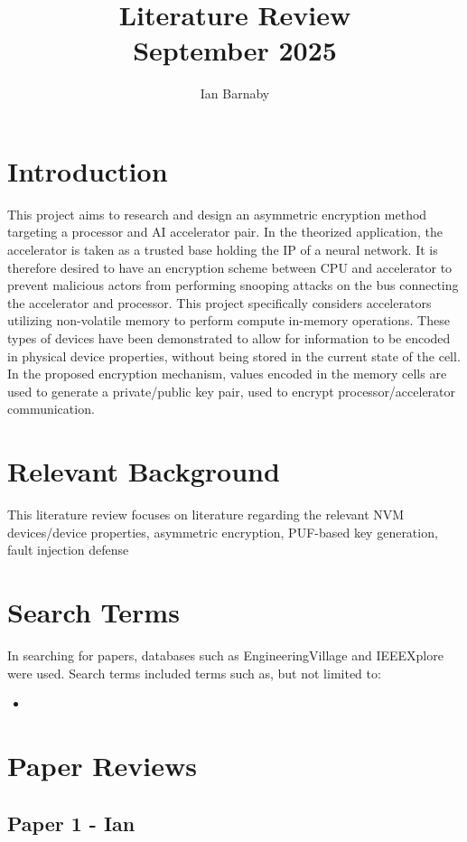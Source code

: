 \documentclass[sigconf,authoryear]{acmart}
\title{Literature Review\protect\\ \large September 2025}
\author{Ian Barnaby}\author{}\author{}
\begin{document}
\maketitle

\section{Introduction}
This project aims to research and design an asymmetric encryption method targeting a processor and AI accelerator pair. In the 
theorized application, the accelerator is taken as a trusted base holding the IP of a neural network. It is therefore desired to
have an encryption scheme between CPU and accelerator to prevent malicious actors from performing snooping attacks on the bus connecting
the accelerator and processor. This project specifically considers accelerators utilizing non-volatile memory to perform compute 
in-memory operations. These types of devices have been demonstrated to allow for information to be encoded in physical device 
properties, without being stored in the current state of the cell. In the proposed encryption mechanism, values encoded 
in the memory cells are used to generate a private/public key pair, used to encrypt processor/accelerator communication.

\section{Relevant Background}
This literature review focuses on literature regarding the relevant NVM devices/device properties, asymmetric encryption, PUF-based key
generation, fault injection defense


\section{Search Terms}
In searching for papers, databases such as EngineeringVillage and IEEEXplore were used. Search terms included terms such as, 
but not limited to:
\begin{itemize}
    \item 
\end{itemize}


\section{Paper Reviews}
\subsection{Paper 1 - Ian}
\end{document}

